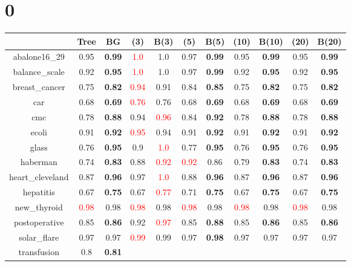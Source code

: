 \documentclass{article}%
\begin{document}
%
\normalsize%
\section*{0}%
\begin{tabular}{c|cccccccccc}%
\hline%
&Tree&BG&(3)&B(3)&(5)&B(5)&(10)&B(10)&(20)&B(20)\\%
\hline%
abalone16\_29&0.95&\textbf{0.99}&\textcolor{red}{ 
1.0
}&1.0&0.97&\textbf{0.99}&0.95&\textbf{0.99}&0.95&\textbf{0.99}\\%
\hline%
balance\_scale&0.92&\textbf{0.95}&\textcolor{red}{ 
1.0
}&1.0&0.97&\textbf{0.99}&0.92&\textbf{0.95}&0.92&\textbf{0.95}\\%
\hline%
breast\_cancer&0.75&\textbf{0.82}&\textcolor{red}{ 
0.94
}&0.91&0.84&\textbf{0.85}&0.75&\textbf{0.82}&0.75&\textbf{0.82}\\%
\hline%
car&0.68&\textbf{0.69}&\textcolor{red}{ 
0.76
}&0.76&0.68&\textbf{0.69}&0.68&\textbf{0.69}&0.68&\textbf{0.69}\\%
\hline%
cmc&0.78&\textbf{0.88}&0.94&\textcolor{red}{ 
0.96
}&0.84&\textbf{0.92}&0.78&\textbf{0.88}&0.78&\textbf{0.88}\\%
\hline%
ecoli&0.91&\textbf{0.92}&\textcolor{red}{ 
0.95
}&0.94&0.91&\textbf{0.92}&0.91&\textbf{0.92}&0.91&\textbf{0.92}\\%
\hline%
glass&0.76&\textbf{0.95}&0.9&\textcolor{red}{ 
1.0
}&0.77&\textbf{0.95}&0.76&\textbf{0.95}&0.76&\textbf{0.95}\\%
\hline%
haberman&0.74&\textbf{0.83}&0.88&\textcolor{red}{ 
0.92
}&\textcolor{red}{ 
0.92
}&0.86&0.79&\textbf{0.83}&0.74&\textbf{0.83}\\%
\hline%
heart\_cleveland&0.87&\textbf{0.96}&0.97&\textcolor{red}{ 
1.0
}&0.88&\textbf{0.96}&0.87&\textbf{0.96}&0.87&\textbf{0.96}\\%
\hline%
hepatitis&0.67&\textbf{0.75}&0.67&\textcolor{red}{ 
0.77
}&0.71&\textbf{0.75}&0.67&\textbf{0.75}&0.67&\textbf{0.75}\\%
\hline%
new\_thyroid&\textcolor{red}{ 
0.98
}&0.98&\textcolor{red}{ 
0.98
}&0.98&\textcolor{red}{ 
0.98
}&0.98&\textcolor{red}{ 
0.98
}&0.98&\textcolor{red}{ 
0.98
}&0.98\\%
\hline%
postoperative&0.85&\textbf{0.86}&0.92&\textcolor{red}{ 
0.97
}&0.85&\textbf{0.88}&0.85&\textbf{0.86}&0.85&\textbf{0.86}\\%
\hline%
solar\_flare&0.97&0.97&\textcolor{red}{ 
0.99
}&0.99&0.97&\textbf{0.98}&0.97&0.97&0.97&0.97\\%
\hline%
transfusion&0.8&\textbf{0.81}&\textcolor{red}{ 
}
\end{tabular}
\end{document}
